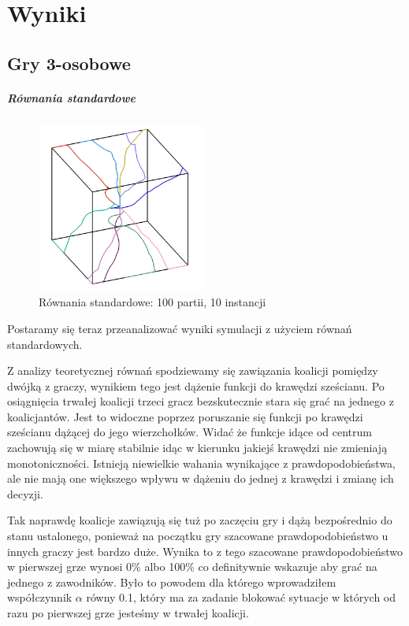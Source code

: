 \chapter{Wyniki}
\label{cha:wyniki}

\section{Gry 3-osobowe}
\label{sec:N3nzal}

\paragraph{Równania standardowe}
\label{sec:r_stan}
\begin{figure}
    \centering
    \includegraphics[width=0.5\textwidth]{pict/wyniki/stand100_10.png}   
    \caption{Równania standardowe: 100 partii, 10 instancji}
	\label{fig:stand50_10} 
\end{figure}

Postaramy się teraz przeanalizować wyniki symulacji z użyciem równań standardowych. 

Z analizy teoretycznej równań spodziewamy się zawiązania koalicji pomiędzy dwójką z graczy, wynikiem tego jest dążenie funkcji do krawędzi sześcianu. Po osiągnięcia trwałej koalicji trzeci gracz bezskutecznie stara się grać na jednego z koalicjantów. Jest to widoczne poprzez poruszanie się funkcji po krawędzi sześcianu dążącej do jego wierzchołków. Widać że funkcje idące od centrum zachowują się w miarę stabilnie idąc w kierunku jakiejś krawędzi nie zmieniają monotoniczności. Istnieją niewielkie wahania wynikające z prawdopodobieństwa, ale nie mają one większego wpływu w dążeniu do jednej z krawędzi i zmianę ich decyzji. 

Tak naprawdę koalicje zawiązują się tuż po zaczęciu gry i dążą bezpośrednio do stanu ustalonego,  ponieważ na początku gry szacowane prawdopodobieństwo u innych graczy jest bardzo duże. Wynika to z tego szacowane prawdopodobieństwo w pierwszej grze wynosi 0\% albo 100\% co definitywnie wskazuje aby grać na jednego z zawodników. Było to powodem dla którego wprowadziłem współczynnik $\alpha$ równy 0.1, który ma za zadanie blokować sytuacje w których od razu po pierwszej grze jesteśmy w trwałej koalicji.

